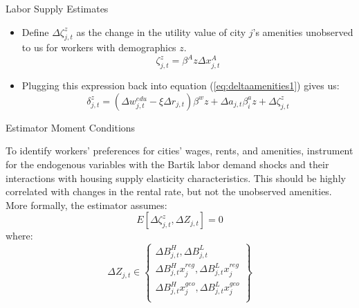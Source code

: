 \documentclass[aspectratio=169]{beamer}
\begin{document}

\begin{frame}{Labor Supply Estimates}

\begin{itemize}
    \item<1-> Define $ \Delta \zeta_{j,t}^{z} $ as the change in the utility value of city $ j $’s amenities unobserved to us for workers with demographics $ z $.
    \begin{equation*}
        \zeta_{j,t}^{z} = \beta^{A} z \Delta x_{j,t}^{A}
    \end{equation*}
    \item<2-> Plugging this expression back into equation (\ref{eq:deltaamenities1}) gives us:
    \begin{equation}
        \delta_{j,t}^{z} = \left( \Delta w_{j,t}^{edu} - \xi \Delta r_{j,t} \right) \beta^{w} z + \Delta a_{j,t} \beta_{i}^{a} z + \Delta \zeta_{j,t}^{z}
        \label{eq:deltaamenities2}
    \end{equation}
\end{itemize}
    
\end{frame}


\begin{frame}{Estimator Moment Conditions}

To identify workers’ preferences for cities’ wages, rents, and amenities, instrument for the endogenous variables with the Bartik labor demand shocks and their interactions with housing supply elasticity characteristics.  This should be highly correlated with changes in the rental rate, but not the unobserved amenities.  More formally, the estimator assumes:
\begin{equation*}
    E\left[ \Delta \zeta_{j,t}^{z} , \Delta Z_{j,t} \right] = 0
\end{equation*}
where:
\begin{equation*}
    \Delta Z_{j,t} \in \left\{ \begin{matrix}
            \Delta B_{j,t}^{H} , \Delta B_{j,t}^{L} \\
            \Delta B_{j,t}^{H} x_{j}^{reg} , \Delta B_{j,t}^{L} x_{j}^{reg} \\
            \Delta B_{j,t}^{H} x_{j}^{geo} , \Delta B_{j,t}^{L} x_{j}^{geo} \\
        \end{matrix} \right\}
\end{equation*}
    
\end{frame}

\end{document}
